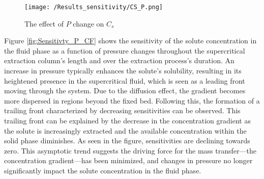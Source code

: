 \documentclass[../Article_Sensitivity_Analsysis.tex]{subfiles}
\begin{document}

	\begin{figure}[h!]
		\centering
		\texttt{[image: /Results\_sensitivity/CS\_P.png]}
		\caption{The effect of $P$ change on $C_s$}
		\label{fig:Sensitivty_P_CS}
	\end{figure}

	Figure \ref{fig:Sensitivty_P_CF} shows the sensitivity of the solute concentration in the fluid phase as a function of pressure changes throughout the supercritical extraction column's length and over the extraction process's duration. An increase in pressure typically enhances the solute's solubility, resulting in its heightened presence in the supercritical fluid, which is seen as a leading front moving through the system. Due to the diffusion effect, the gradient becomes more dispersed in regions beyond the fixed bed. Following this, the formation of a trailing front characterized by decreasing sensitivities can be observed. This trailing front can be explained by the decrease in the concentration gradient as the solute is increasingly extracted and the available concentration within the solid phase diminishes. As seen in the figure, sensitivities are declining towards zero. This asymptotic trend suggests the driving force for the mass transfer—the concentration gradient—has been minimized, and changes in pressure no longer significantly impact the solute concentration in the fluid phase.
\end{document}
